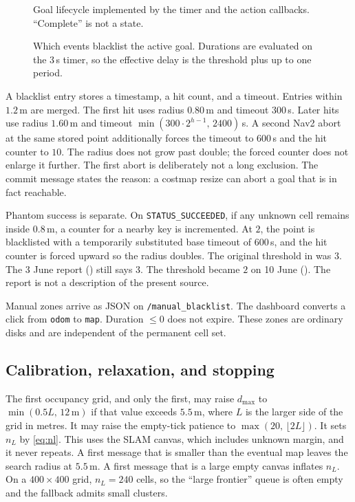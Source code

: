 \documentclass[11pt]{article}
\begin{document}
\begin{figure}[ht]
\centering
\FigLifecycle
\caption{Goal lifecycle implemented by the timer and the action callbacks. ``Complete'' is not a state.}
\label{fig:life}
\end{figure}

\begin{figure}[ht]
\centering
\FigRecovery
\caption{Which events blacklist the active goal. Durations are evaluated on the $3$\,s timer, so the effective delay is the threshold plus up to one period.}
\label{fig:rec}
\end{figure}

A blacklist entry stores a timestamp, a hit count, and a timeout. Entries within $1.2$\,m are merged. The first hit uses radius $0.80$\,m and timeout $300$\,s. Later hits use radius $1.60$\,m and timeout $\min(300\cdot 2^{h-1},\,2400)$\,s. A second Nav2 abort at the same stored point additionally forces the timeout to $600$\,s and the hit counter to $10$. The radius does not grow past double; the forced counter does not enlarge it further. The first abort is deliberately not a long exclusion. The commit message states the reason: a costmap resize can abort a goal that is in fact reachable.

Phantom success is separate. On \texttt{STATUS\_SUCCEEDED}, if any unknown cell remains inside $0.8$\,m, a counter for a nearby key is incremented. At $2$, the point is blacklisted with a temporarily substituted base timeout of $600$\,s, and the hit counter is forced upward so the radius doubles. The original threshold in  was $3$. The 3 June report () still says $3$. The threshold became $2$ on 10 June (). The report is not a description of the present source.

Manual zones arrive as JSON on \texttt{/manual\_blacklist}. The dashboard converts a click from \texttt{odom} to \texttt{map}. Duration $\le 0$ does not expire. These zones are ordinary disks and are independent of the permanent cell set.

\subsection{Calibration, relaxation, and stopping}
The first occupancy grid, and only the first, may raise $d_{\max}$ to $\min(0.5 L,\,12\,\mathrm{m})$ if that value exceeds $5.5$\,m, where $L$ is the larger side of the grid in metres. It may raise the empty-tick patience to $\max(20,\,\lfloor 2L\rfloor)$. It sets $n_L$ by \eqref{eq:nl}. This uses the SLAM canvas, which includes unknown margin, and it never repeats. A first message that is smaller than the eventual map leaves the search radius at $5.5$\,m. A first message that is a large empty canvas inflates $n_L$. On a $400\times 400$ grid, $n_L=240$ cells, so the ``large frontier'' queue is often empty and the fallback admits small clusters.
\end{document}
